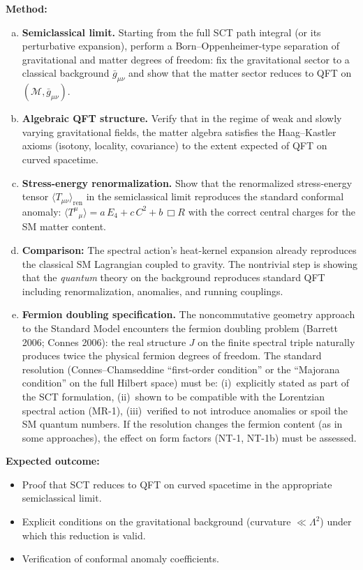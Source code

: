 \documentclass[12pt,a4paper]{article}
\newcommand{\method}[1]{\noindent\textbf{Method:} #1\par}
\newcommand{\outcome}[1]{\noindent\textbf{Expected outcome:} #1\par}
\begin{document}
\method{
\begin{enumerate}[(a)]
  \item \textbf{Semiclassical limit.} Starting from the full SCT path integral
    (or its perturbative expansion), perform a Born--Oppenheimer-type separation
    of gravitational and matter degrees of freedom: fix the gravitational sector
    to a classical background $\bar{g}_{\mu\nu}$ and show that the matter sector
    reduces to QFT on $(\mathcal{M}, \bar{g}_{\mu\nu})$.
  \item \textbf{Algebraic QFT structure.} Verify that in the regime of weak
    and slowly varying gravitational fields, the matter algebra satisfies
    the Haag--Kastler axioms (isotony, locality, covariance) to the extent
    expected of QFT on curved spacetime.
  \item \textbf{Stress-energy renormalization.} Show that the renormalized
    stress-energy tensor $\langle T_{\mu\nu}\rangle_{\text{ren}}$ in the
    semiclassical limit reproduces the standard conformal anomaly:
    $\langle T^\mu{}_\mu\rangle = a\,E_4 + c\,C^2 + b\,\Box R$ with
    the correct central charges for the SM matter content.
  \item \textbf{Comparison:} The spectral action's heat-kernel expansion
    already reproduces the classical SM Lagrangian coupled to gravity.
    The nontrivial step is showing that the \emph{quantum} theory on
    the background reproduces standard QFT including renormalization,
    anomalies, and running couplings.
  \item \textbf{Fermion doubling specification.} The noncommutative geometry
    approach to the Standard Model encounters the fermion doubling problem
    (Barrett 2006; Connes 2006): the real structure $J$ on the finite spectral
    triple naturally produces twice the physical fermion degrees of freedom.
    The standard resolution (Connes--Chamseddine ``first-order condition'' or
    the ``Majorana condition'' on the full Hilbert space) must be:
    (i)~explicitly stated as part of the SCT formulation,
    (ii)~shown to be compatible with the Lorentzian spectral action (MR-1),
    (iii)~verified to not introduce anomalies or spoil the SM quantum numbers.
    If the resolution changes the fermion content (as in some approaches), the
    effect on form factors (NT-1, NT-1b) must be assessed.
\end{enumerate}
}

\outcome{
\begin{itemize}
  \item Proof that SCT reduces to QFT on curved spacetime in the
    appropriate semiclassical limit.
  \item Explicit conditions on the gravitational background (curvature
    $\ll \Lambda^2$) under which this reduction is valid.
  \item Verification of conformal anomaly coefficients.
\end{itemize}
}
\end{document}

